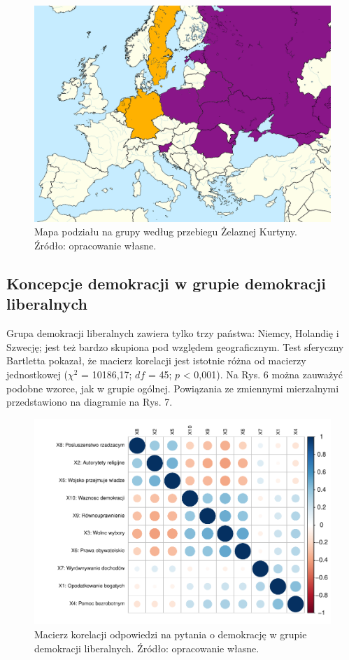 \documentclass[12pt]{article}
\begin{document}
\begin{figure}
\includegraphics[width=450px]{map1} \caption{Mapa podziału na grupy według przebiegu Żelaznej Kurtyny. Źródło: opracowanie własne.}\label{fig:map1}
\end{figure}

\hypertarget{koncepcje-demokracji-w-grupie-demokracji-liberalnych}{%
\subsection{Koncepcje demokracji w grupie demokracji liberalnych}\label{koncepcje-demokracji-w-grupie-demokracji-liberalnych}}

Grupa demokracji liberalnych zawiera tylko trzy państwa: Niemcy, Holandię i Szwecję; jest też bardzo skupiona pod względem geograficznym. Test sferyczny Bartletta pokazał, że macierz korelacji jest istotnie różna od macierzy jednostkowej (\(\chi^2\) = 10186,17; \(df\) = 45; \(p\) \textless{} 0,001). Na Rys. 6 można zauważyć podobne wzorce, jak w grupie ogólnej. Powiązania ze zmiennymi mierzalnymi przedstawiono na diagramie na Rys. 7.

\begin{figure}

\includegraphics{text_ASA_files/figure-latex/cor-matrix-lib-1} \hfill{}

\caption{Macierz korelacji odpowiedzi na pytania o demokrację w grupie demokracji liberalnych. Źródło: opracowanie własne.}\label{fig:cor-matrix-lib}
\end{figure}
\end{document}
